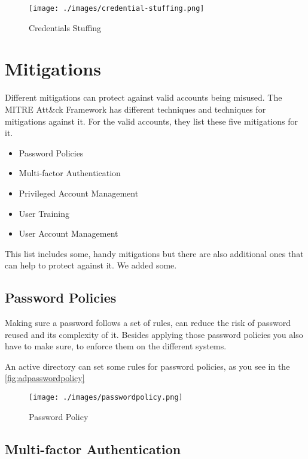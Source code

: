 \begin{figure}[h]
    \centering
    \texttt{[image: ./images/credential-stuffing.png]}
    \caption{Credentials Stuffing}
    \label{fig:credentialstuffing}
\end{figure}

\chapter{Mitigations}
Different mitigations can protect against valid accounts being misused.
The MITRE Att\&ck Framework has different techniques and techniques for mitigations against it.
For the valid accounts, they list these five mitigations for it.

\begin{itemize}
    \item Password Policies 
    \item Multi-factor Authentication 
    \item Privileged Account Management 
    \item User Training 
    \item User Account Management 
\end{itemize}

This list includes some, handy mitigations but there are also additional ones that can help to protect against it.
We added some.

\section{Password Policies}
Making sure a password follows a set of rules, can reduce the risk of password reused and its complexity of it.
Besides applying those password policies you also have to make sure, to enforce them on the different systems.

An active directory can set some rules for password policies, as you see in the \autoref{fig:adpasswordpolicy}

\begin{figure}[h]
    \centering
    \texttt{[image: ./images/passwordpolicy.png]}
    \caption{Password Policy}
    \label{fig:adpasswordpolicy}
\end{figure}

\section{Multi-factor Authentication} 


